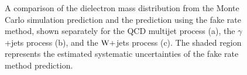 \documentclass{cmspaper}
\begin{document}
\begin{figure}[htb]
  \begin{center}
    \caption{A comparison of the dielectron mass distribution from the Monte Carlo simulation prediction and the prediction using the fake rate method, shown separately for the QCD multijet process (a), the $\gamma$+jets process (b), and the $\mathrm{W}+$jets process (c). The shaded region represents the estimated systematic uncertainties of the fake rate method prediction.}
    \label{fig:zeeDileptonMass_FakeRatePrediction}
  \end{center}
\end{figure}
\end{document}

